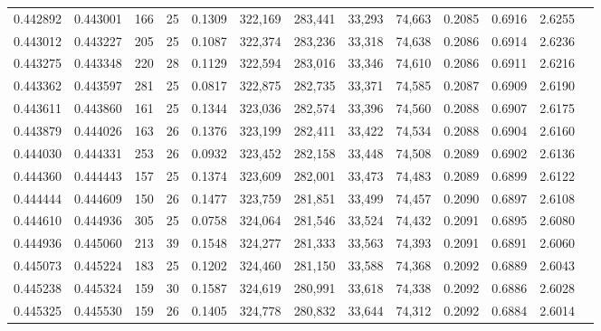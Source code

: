 \begin{tabular}{rrrrrrrrrrrrr}
0.442892 & 0.443001 &    166 &    25 &                                     0.1309 & 322,169 & 283,441 &  33,293 &  74,663 & 0.2085 & 0.6916 & 2.6255 \\
0.443012 & 0.443227 &    205 &    25 &                                     0.1087 & 322,374 & 283,236 &  33,318 &  74,638 & 0.2086 & 0.6914 & 2.6236 \\
0.443275 & 0.443348 &    220 &    28 &                                     0.1129 & 322,594 & 283,016 &  33,346 &  74,610 & 0.2086 & 0.6911 & 2.6216 \\
0.443362 & 0.443597 &    281 &    25 &                                     0.0817 & 322,875 & 282,735 &  33,371 &  74,585 & 0.2087 & 0.6909 & 2.6190 \\
0.443611 & 0.443860 &    161 &    25 &                                     0.1344 & 323,036 & 282,574 &  33,396 &  74,560 & 0.2088 & 0.6907 & 2.6175 \\
0.443879 & 0.444026 &    163 &    26 &                                     0.1376 & 323,199 & 282,411 &  33,422 &  74,534 & 0.2088 & 0.6904 & 2.6160 \\
0.444030 & 0.444331 &    253 &    26 &                                     0.0932 & 323,452 & 282,158 &  33,448 &  74,508 & 0.2089 & 0.6902 & 2.6136 \\
0.444360 & 0.444443 &    157 &    25 &                                     0.1374 & 323,609 & 282,001 &  33,473 &  74,483 & 0.2089 & 0.6899 & 2.6122 \\
0.444444 & 0.444609 &    150 &    26 &                                     0.1477 & 323,759 & 281,851 &  33,499 &  74,457 & 0.2090 & 0.6897 & 2.6108 \\
0.444610 & 0.444936 &    305 &    25 &                                     0.0758 & 324,064 & 281,546 &  33,524 &  74,432 & 0.2091 & 0.6895 & 2.6080 \\
0.444936 & 0.445060 &    213 &    39 &                                     0.1548 & 324,277 & 281,333 &  33,563 &  74,393 & 0.2091 & 0.6891 & 2.6060 \\
0.445073 & 0.445224 &    183 &    25 &                                     0.1202 & 324,460 & 281,150 &  33,588 &  74,368 & 0.2092 & 0.6889 & 2.6043 \\
0.445238 & 0.445324 &    159 &    30 &                                     0.1587 & 324,619 & 280,991 &  33,618 &  74,338 & 0.2092 & 0.6886 & 2.6028 \\
0.445325 & 0.445530 &    159 &    26 &                                     0.1405 & 324,778 & 280,832 &  33,644 &  74,312 & 0.2092 & 0.6884 & 2.6014 \\

\end{tabular}
